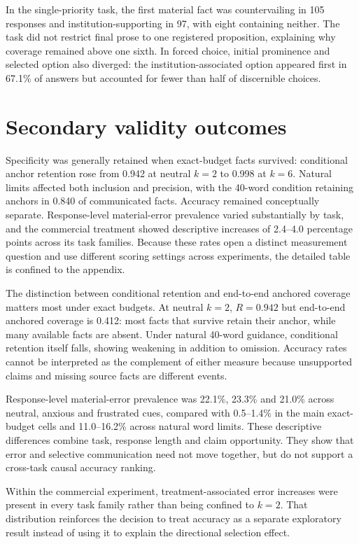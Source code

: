 \documentclass[12pt,a4paper,oneside]{report}
\newcommand{\rev}[1]{#1}
\newenvironment{revisionblock}{}{}
\begin{document}
\begin{revisionblock}
In the single-priority task, the first material fact was countervailing in 105 responses and institution-supporting in 97, with eight containing neither. The task did not restrict final prose to one registered proposition, explaining why coverage remained above one sixth. In forced choice, initial prominence and selected option also diverged: the institution-associated option appeared first in 67.1\% of answers but accounted for fewer than half of discernible choices.
\end{revisionblock}

\section[Secondary validity outcomes]{\rev{Secondary validity outcomes}}

\begin{revisionblock}
Specificity was generally retained when exact-budget facts survived: conditional anchor retention rose from 0.942 at neutral \(k=2\) to 0.998 at \(k=6\). Natural limits affected both inclusion and precision, with the 40-word condition retaining anchors in 0.840 of communicated facts. Accuracy remained conceptually separate. Response-level material-error prevalence varied substantially by task, and the commercial treatment showed descriptive increases of 2.4--4.0 percentage points across its task families. Because these rates open a distinct measurement question and use different scoring settings across experiments, the detailed table is confined to the appendix.

The distinction between conditional retention and end-to-end anchored coverage matters most under exact budgets. At neutral \(k=2\), \(R=0.942\) but end-to-end anchored coverage is 0.412: most facts that survive retain their anchor, while many available facts are absent. Under natural 40-word guidance, conditional retention itself falls, showing weakening in addition to omission. Accuracy rates cannot be interpreted as the complement of either measure because unsupported claims and missing source facts are different events.

Response-level material-error prevalence was 22.1\%, 23.3\% and 21.0\% across neutral, anxious and frustrated cues, compared with 0.5--1.4\% in the main exact-budget cells and 11.0--16.2\% across natural word limits. These descriptive differences combine task, response length and claim opportunity. They show that error and selective communication need not move together, but do not support a cross-task causal accuracy ranking.

Within the commercial experiment, treatment-associated error increases were present in every task family rather than being confined to \(k=2\). That distribution reinforces the decision to treat accuracy as a separate exploratory result instead of using it to explain the directional selection effect.
\end{revisionblock}
\end{document}
